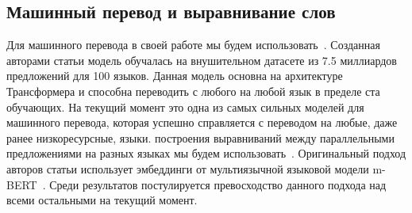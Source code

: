 \subsection{Машинный перевод и выравнивание слов}
Для машинного перевода в своей работе мы будем использовать~\cite{Fan2020BeyondEM}.
Созданная авторами статьи модель обучалась на внушительном датасете из 7.5 миллиардов предложений для 100 языков.
Данная модель основна на архитектуре Трансформера и способна переводить с любого на любой язык в пределе ста обучающих.
На текущий момент это одна из самых сильных моделей для машинного перевода, которая успешно справляется с переводом на любые, даже ранее низкоресурсные, языки.
 построения выравниваний между параллельными предложениями на разных языках мы будем использовать~\cite{Dou2021WordAB}.
Оригинальный подход авторов статьи использует эмбеддинги от мультиязычной языковой модели m-BERT~\cite{devlin-etal-2019-bert}.
Среди результатов постулируется превосходство данного подхода над всеми остальными на текущий момент.
